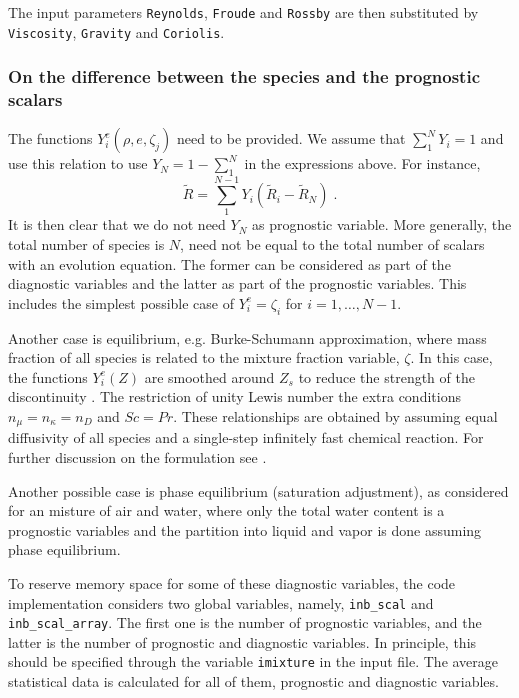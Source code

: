 The input parameters \texttt{Reynolds}, \texttt{Froude} and \texttt{Rossby} are then substituted by \texttt{Viscosity}, \texttt{Gravity} and \texttt{Coriolis}.

\subsubsection{On the difference between the species and the prognostic scalars}

The functions $Y_i^e(\rho,e,\zeta_j)$ need to be provided. We assume that $\sum_1^NY_i=1$ and use this relation to use $Y_N=1-\sum_1^N$ in the expressions above. For instance,
\begin{equation}
    \tilde{R}=\sum_1^{N-1}Y_i(\tilde{R}_i-\tilde{R}_N) \;.
\end{equation}
It is then clear that we do not need $Y_N$ as prognostic variable. More generally, the total number of species is $N$, need not be equal to the total number of scalars with an evolution equation. The former can be considered as part of the diagnostic variables and the latter as part of the prognostic variables. This includes the simplest possible case of $Y_i^e = \zeta_i$ for $i=1,\ldots,N-1$. 

Another case is equilibrium, e.g. Burke-Schumann approximation, where mass fraction of all species is related to the mixture fraction variable, $\zeta$.  In this case, the functions $Y_i^e(Z)$ are smoothed around $Z_s$ to reduce the strength of the discontinuity \citep{Higuera:1994}. The restriction of unity Lewis number the extra conditions $n_\mu=n_\kappa=n_D$ and $Sc=Pr$. These relationships are obtained by assuming equal diffusivity of all species and a single-step infinitely fast chemical reaction.  For further discussion on the formulation see \cite{Williams:1985}.

Another possible case is phase equilibrium (saturation adjustment), as considered for an misture of air and water, where only the total water content is a prognostic variables and the partition into liquid and vapor is done assuming phase equilibrium. 

To reserve memory space for some of these diagnostic variables, the code implementation considers two global variables, namely, {\tt inb\_scal} and {\tt inb\_scal\_array}. The first one is the number of prognostic variables, and the latter is the number of prognostic and diagnostic variables. In principle, this should be specified through the variable {\tt imixture} in the input file. The average statistical data is calculated for all of them, prognostic and diagnostic variables.

